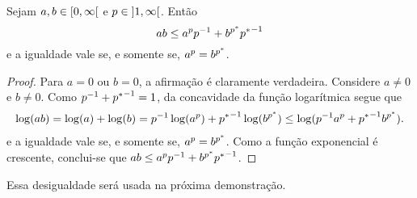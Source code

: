 \begin{proposition}
\label{prop:ana.desig.young}
Sejam $a,b \in \left[0,\allowbreak \infty\right[$ e $p \in \left]1,\allowbreak \infty\right[$. Então
	\begin{equation*}
	ab \leq a^p p^{-1} + b^{p^{\ast}} {p^{\ast}}^{-1}
	\end{equation*}
e a igualdade vale se, e somente se, $a^p = b^{p^{\ast}}$.
\end{proposition}
\begin{proof}
Para $a=0$ ou $b=0$, a afirmação é claramente verdadeira. Considere $a \neq 0$ e $b \neq 0$. Como $p^{-1} + {p^{\ast}}^{-1} = 1$, da concavidade da função logarítmica segue que
	\begin{align*}
	\log(ab) = \log(a) + \log(b) = p^{-1} \log(a^p) + {p^{\ast}}^{-1} \log(b^{p^{\ast}}) \leq \log(p^{-1} a^p + {p^{\ast}}^{-1} b^{p^{\ast}}).
	\end{align*}
e a igualdade vale se, e somente se, $a^p = b^{p^{\ast}}$. Como a função exponencial é crescente, conclui-se que $ab \leq a^p p^{-1} + b^{p^{\ast}} {p^{\ast}}^{-1}$.
\end{proof}

Essa desigualdade será usada na próxima demonstração.


